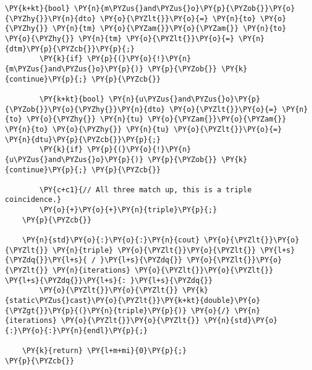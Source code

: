 \begin{Verbatim}[commandchars=\\\{\}]
        \PY{k+kt}{bool} \PY{n}{m\PYZus{}and\PYZus{}o}\PY{p}{\PYZob{}}\PY{o}{\PYZhy{}}\PY{n}{dto} \PY{o}{\PYZlt{}}\PY{o}{=} \PY{n}{to} \PY{o}{\PYZhy{}} \PY{n}{tm} \PY{o}{\PYZam{}}\PY{o}{\PYZam{}} \PY{n}{to} \PY{o}{\PYZhy{}} \PY{n}{tm} \PY{o}{\PYZlt{}}\PY{o}{=} \PY{n}{dtm}\PY{p}{\PYZcb{}}\PY{p}{;}
        \PY{k}{if} \PY{p}{(}\PY{o}{!}\PY{n}{m\PYZus{}and\PYZus{}o}\PY{p}{)} \PY{p}{\PYZob{}} \PY{k}{continue}\PY{p}{;} \PY{p}{\PYZcb{}}

        \PY{k+kt}{bool} \PY{n}{u\PYZus{}and\PYZus{}o}\PY{p}{\PYZob{}}\PY{o}{\PYZhy{}}\PY{n}{dto} \PY{o}{\PYZlt{}}\PY{o}{=} \PY{n}{to} \PY{o}{\PYZhy{}} \PY{n}{tu} \PY{o}{\PYZam{}}\PY{o}{\PYZam{}} \PY{n}{to} \PY{o}{\PYZhy{}} \PY{n}{tu} \PY{o}{\PYZlt{}}\PY{o}{=} \PY{n}{dtu}\PY{p}{\PYZcb{}}\PY{p}{;}
        \PY{k}{if} \PY{p}{(}\PY{o}{!}\PY{n}{u\PYZus{}and\PYZus{}o}\PY{p}{)} \PY{p}{\PYZob{}} \PY{k}{continue}\PY{p}{;} \PY{p}{\PYZcb{}}

        \PY{c+c1}{// All three match up, this is a triple coincidence.}
        \PY{o}{+}\PY{o}{+}\PY{n}{triple}\PY{p}{;}
    \PY{p}{\PYZcb{}}

    \PY{n}{std}\PY{o}{:}\PY{o}{:}\PY{n}{cout} \PY{o}{\PYZlt{}}\PY{o}{\PYZlt{}} \PY{n}{triple} \PY{o}{\PYZlt{}}\PY{o}{\PYZlt{}} \PY{l+s}{\PYZdq{}}\PY{l+s}{ / }\PY{l+s}{\PYZdq{}} \PY{o}{\PYZlt{}}\PY{o}{\PYZlt{}} \PY{n}{iterations} \PY{o}{\PYZlt{}}\PY{o}{\PYZlt{}} \PY{l+s}{\PYZdq{}}\PY{l+s}{: }\PY{l+s}{\PYZdq{}}
        \PY{o}{\PYZlt{}}\PY{o}{\PYZlt{}} \PY{k}{static\PYZus{}cast}\PY{o}{\PYZlt{}}\PY{k+kt}{double}\PY{o}{\PYZgt{}}\PY{p}{(}\PY{n}{triple}\PY{p}{)} \PY{o}{/} \PY{n}{iterations} \PY{o}{\PYZlt{}}\PY{o}{\PYZlt{}} \PY{n}{std}\PY{o}{:}\PY{o}{:}\PY{n}{endl}\PY{p}{;}

    \PY{k}{return} \PY{l+m+mi}{0}\PY{p}{;}
\PY{p}{\PYZcb{}}
\end{Verbatim}
